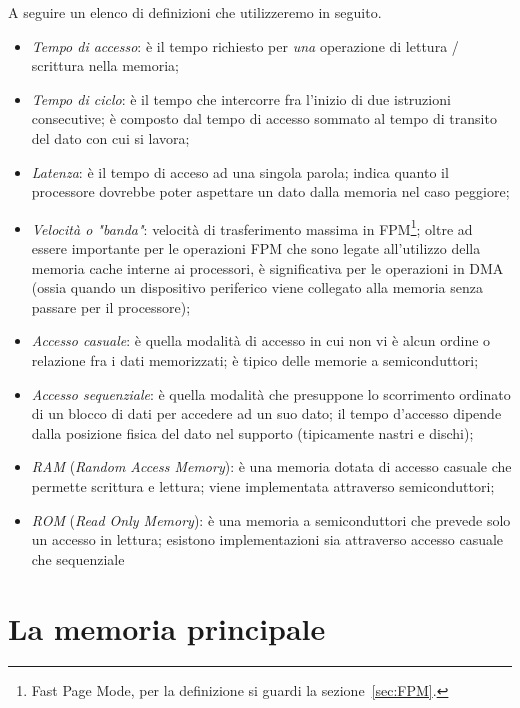\documentclass[class=book, crop=false, oneside]{standalone}
\begin{document}
A seguire un elenco di definizioni che utilizzeremo in seguito.
\begin{itemize}
	\item \emph{Tempo di accesso}: è il tempo richiesto per \emph{una} operazione di lettura / scrittura nella memoria;
	\item \emph{Tempo di ciclo}: è il tempo che intercorre fra l'inizio di due istruzioni consecutive; è composto dal tempo di accesso sommato al tempo di transito del dato con cui si lavora;
	\item \emph{Latenza}: è il tempo di acceso ad una singola parola; indica quanto il processore dovrebbe poter aspettare un dato dalla memoria nel caso peggiore;
	\item \emph{Velocità o "banda"}: velocità di trasferimento massima in FPM\footnote{Fast Page Mode, per la definizione si guardi la sezione~\ref{sec:FPM}.}; oltre ad essere importante per le operazioni FPM che sono legate all'utilizzo della memoria cache interne ai processori, è significativa per le operazioni in DMA (ossia quando un dispositivo periferico viene collegato alla memoria senza passare per il processore);
	\item \emph{Accesso casuale}: è quella modalità di accesso in cui non vi è alcun ordine o relazione fra i dati memorizzati; è tipico delle memorie a semiconduttori;
	\item \emph{Accesso sequenziale}: è quella modalità che presuppone lo scorrimento ordinato di un blocco di dati per accedere ad un suo dato; il tempo d'accesso dipende dalla posizione fisica del dato nel supporto (tipicamente nastri e dischi);
	\item \emph{RAM} (\emph{Random Access Memory}): è una memoria dotata di accesso casuale che permette scrittura e lettura; viene implementata attraverso semiconduttori;
	\item \emph{ROM} (\emph{Read Only Memory}): è una memoria a semiconduttori che prevede solo un accesso in lettura; esistono implementazioni sia attraverso accesso casuale che sequenziale
\end{itemize}

\section{La memoria principale}
\end{document}
